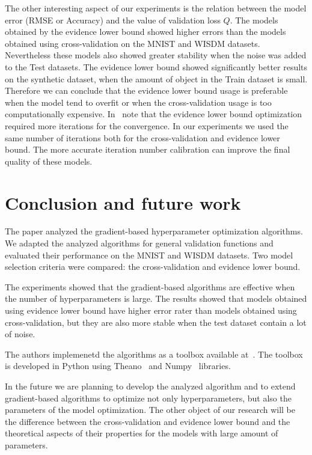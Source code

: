 \documentclass[12pt]{article}
\begin{document}
The other interesting aspect of our experiments is the relation between the model error (RMSE or Accuracy) and the value of validation loss $Q$. The models obtained by the evidence lower bound showed higher errors than the models obtained using cross-validation on the MNIST and WISDM datasets. Nevertheless these models also showed greater stability when the noise was added to the Test datasets.  The evidence lower bound showed significantly better results on the synthetic dataset, when the amount of object in the Train dataset is small. Therefore we can conclude that the evidence lower bound usage is preferable when the model tend to overfit or when the cross-validation usage is too computationally expensive.   In~\cite{nips} note that the evidence lower bound optimization required more iterations for the convergence. In our experiments we used the same number of iterations both for the cross-validation and evidence lower bound. The more accurate iteration number calibration can improve the final quality of these models. 

\section{Conclusion and future work}
The paper analyzed the gradient-based hyperparameter optimization algorithms. We adapted the analyzed algorithms for general validation functions and evaluated their performance on the  MNIST and WISDM datasets. Two model selection criteria were compared: the cross-validation and evidence lower bound. 

The experiments showed that the gradient-based algorithms are effective when the number of hyperparameters is large. The results showed that models obtained using evidence lower bound have higher error rater than models obtained using cross-validation, but they are also more stable when the test dataset contain a lot of noise. 

The authors  implemenetd the algorithms as a toolbox available at~\cite{pyfos}. The toolbox is developed in Python using Theano~\cite{theano} and Numpy~\cite{numpy} libraries. 

In the future we are planning to develop the analyzed algorithm and to extend gradient-based algorithms to optimize not only hyperparameters, but also the parameters of the model optimization. The other object of our research will be the difference between the cross-validation and evidence lower bound and the theoretical aspects of their properties for the models with large amount of parameters.


%

\end{document}
